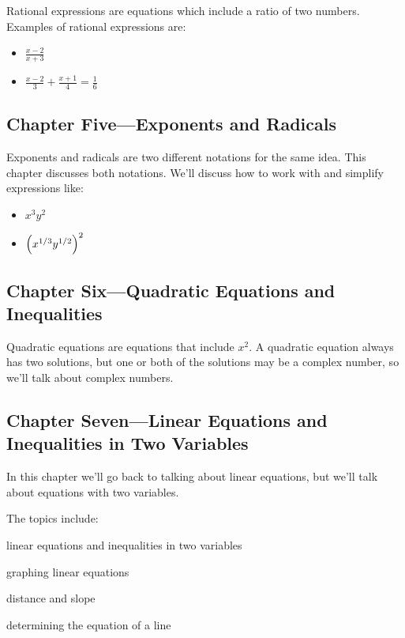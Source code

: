 \documentclass[letterpaper, landscape]{exam}
\begin{document}
    Rational expressions are equations which include a ratio of two numbers.  Examples of rational
    expressions are:

    \begin{itemize}
        \item $\frac{x - 2}{x + 3}$
        \item $\frac{x - 2}{3} + \frac{x + 1}{4} = \frac{1}{6}$
    \end{itemize}

    \subsection{Chapter Five---Exponents and Radicals}

    Exponents and radicals are two different notations for the same idea.  This chapter discusses
    both notations.  We'll discuss how to work with and simplify expressions like:

    \begin{itemize}
        \item $x^3y^2$
        \item $\del{ x^{1/3} y^{1/2} }^2$
    \end{itemize}

    \subsection{Chapter Six---Quadratic Equations and Inequalities}

    Quadratic equations are equations that include $x^2$.  A quadratic equation always has two
    solutions, but one or both of the solutions may be a complex number, so we'll talk about complex
    numbers.

    \subsection{Chapter Seven---Linear Equations and Inequalities in Two Variables}

    In this chapter we'll go back to talking about linear equations, but we'll talk about equations
    with two variables.  
    
    The topics include:
    \begin{itemize*}
        \item linear equations and inequalities in two variables
        \item graphing linear equations
        \item distance and slope
        \item determining the equation of a line
    \end{itemize*}
\end{document}
